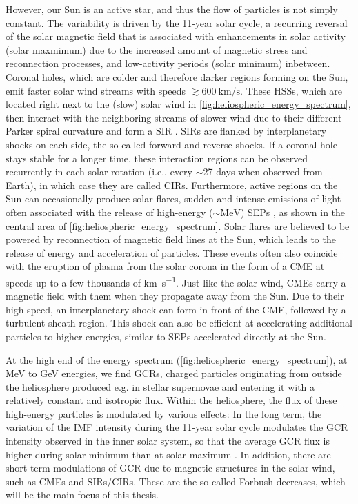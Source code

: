 However, our Sun is an active star, and thus the flow of particles is not simply constant. The variability is driven by the 11-year solar cycle, a recurring reversal of the solar magnetic field that is associated with enhancements in solar activity (solar maxmimum) due to the increased amount of magnetic stress and reconnection processes, and low-activity periods (solar minimum) inbetween.
Coronal holes, which are colder and therefore darker regions forming on the Sun, emit faster solar wind streams with speeds $\gtrsim \SI{600}{\kilo\meter\per\second}$. These \acp{HSS}, which are located right next to the (slow) solar wind in \autoref{fig:heliospheric_energy_spectrum}, then interact with the neighboring streams of slower wind due to their different Parker spiral curvature and form a \acl{SIR} \citep[\acs{SIR}, e.g.][]{Richardson-2018}. \acp{SIR} are flanked by interplanetary shocks on each side, the so-called forward and reverse shocks. If a coronal hole stays stable for a longer time, these interaction regions can be observed recurrently in each solar rotation (i.e., every $\sim$27 days when observed from Earth), in which case they are called \acp{CIR}.
Furthermore, active regions on the Sun can occasionally produce solar flares, sudden and intense emissions of light often associated with the release of high-energy ($\sim \si{\mega\electronvolt}$) \aclp{SEP} \citep[\acsp{SEP}, e.g.][]{Reames-1990}, as shown in the central area of \autoref{fig:heliospheric_energy_spectrum}.
Solar flares are believed to be powered by reconnection of magnetic field lines at the Sun, which leads to the release of energy and acceleration of particles.
These events often also coincide with the eruption of plasma from the solar corona in the form of a \ac{CME} at speeds up to a few thousands of \si{\kilo\meter\per\second}.
Just like the solar wind, \acp{CME} carry a magnetic field with them when they propagate away from the Sun. Due to their high speed, an interplanetary shock can form in front of the \ac{CME}, followed by a turbulent sheath region.
This shock can also be efficient at accelerating additional particles to higher energies, similar to \acp{SEP} accelerated directly at the Sun.

At the high end of the energy spectrum (\autoref{fig:heliospheric_energy_spectrum}), at \si{\mega\electronvolt} to  \si{\giga\electronvolt} energies, we find \acp{GCR}, charged particles originating from outside the heliosphere produced e.g. in stellar supernovae and entering it with a relatively constant and isotropic flux. 
Within the heliosphere, the flux of these high-energy particles is modulated by various effects: In the long term, the variation of the \ac{IMF} intensity during the 11-year solar cycle modulates the \ac{GCR} intensity observed in the inner solar system, so that the average \ac{GCR} flux is higher during solar minimum than at solar maximum \citep{Fisk-1980}. In addition, there are short-term modulations of \ac{GCR} due to magnetic structures in the solar wind, such as \acp{CME} and \acp{SIR}/\acp{CIR}. These are the so-called Forbush decreases, which will be the main focus of this thesis.

